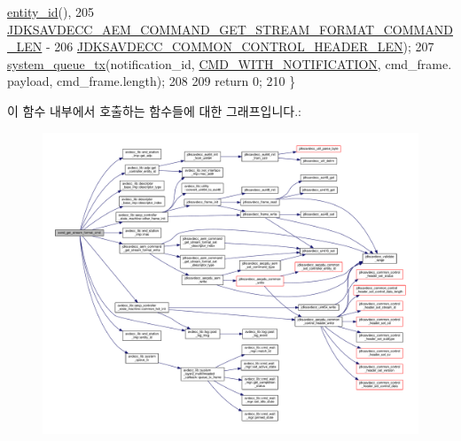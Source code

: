 \begin{DoxyCode}
      \hyperlink{classavdecc__lib_1_1end__station__imp_a363b6c9664a0d701def9b17863e20ad3}{entity\_id}(),
205                                                        
      \hyperlink{group__command__get__stream__format_ga46b2baee8ffa91aaab7a630e72775f46}{JDKSAVDECC\_AEM\_COMMAND\_GET\_STREAM\_FORMAT\_COMMAND\_LEN} -
206                                                            
      \hyperlink{group__jdksavdecc__avtp__common__control__header_gaae84052886fb1bb42f3bc5f85b741dff}{JDKSAVDECC\_COMMON\_CONTROL\_HEADER\_LEN});
207     \hyperlink{namespaceavdecc__lib_a6dd511685627c0865a3442b539a4e8e9}{system\_queue\_tx}(notification\_id, \hyperlink{namespaceavdecc__lib_aabcadff06aa62be0ce47bc0646823604aba48b8a017e06fb240b650cdea965178}{CMD\_WITH\_NOTIFICATION}, cmd\_frame.
      payload, cmd\_frame.length);
208 
209     \textcolor{keywordflow}{return} 0;
210 \}
\end{DoxyCode}


이 함수 내부에서 호출하는 함수들에 대한 그래프입니다.\+:
\nopagebreak
\begin{figure}[H]
\begin{center}
\leavevmode
\includegraphics[width=350pt]{classavdecc__lib_1_1stream__output__descriptor__imp_a55d62cc35400a8d57aefbcfbea84acb9_cgraph}
\end{center}
\end{figure}


